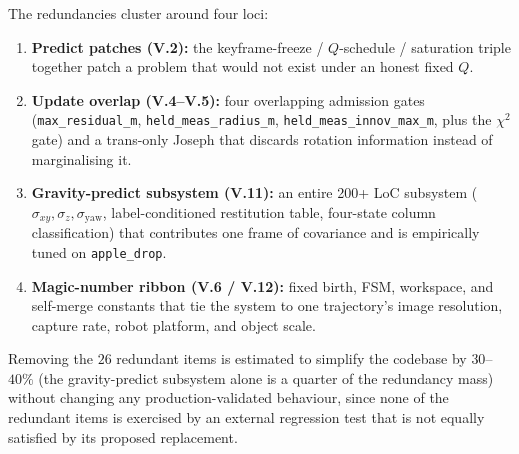 \documentclass[11pt]{article}
\begin{document}
The redundancies cluster around four loci:
\begin{enumerate}[leftmargin=1.5em,itemsep=0pt,topsep=2pt]
\item \textbf{Predict patches (V.2):} the keyframe-freeze /
  $Q$-schedule / saturation triple together patch a problem that would
  not exist under an honest fixed $Q$.
\item \textbf{Update overlap (V.4--V.5):} four overlapping admission
  gates (\texttt{max\_residual\_m}, \texttt{held\_meas\_radius\_m},
  \texttt{held\_meas\_innov\_max\_m}, plus the $\chi^2$ gate) and a
  trans-only Joseph that discards rotation information instead of
  marginalising it.
\item \textbf{Gravity-predict subsystem (V.11):} an entire 200+ LoC
  subsystem ($\sigma_{xy},\sigma_z,\sigma_{\text{yaw}}$, label-conditioned
  restitution table, four-state column classification) that contributes
  one frame of covariance and is empirically tuned on
  \texttt{apple\_drop}.
\item \textbf{Magic-number ribbon (V.6 / V.12):} fixed birth, FSM,
  workspace, and self-merge constants that tie the system to one
  trajectory's image resolution, capture rate, robot platform, and
  object scale.
\end{enumerate}
Removing the $26$ redundant items is estimated to simplify the codebase
by $30$--$40\%$ (the gravity-predict subsystem alone is a quarter of
the redundancy mass) without changing any production-validated
behaviour, since none of the redundant items is exercised by an
external regression test that is not equally satisfied by its proposed
replacement.
\end{document}
